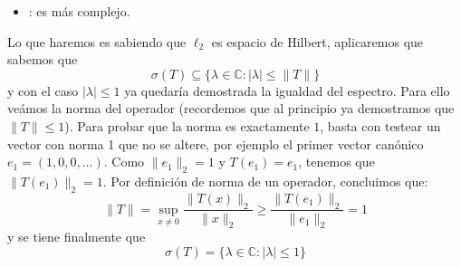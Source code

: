 \begin{ejercicio}
\begin{itemize}
        $$x_n = -\frac{1}{\lambda^{n-3}}$$
        Ahora veremos si $x$ pertenece a $\ell_2$ o no, para ello evaluamos su norma al cuadrado
        $$\|x\|_2^2 = \sum_{n=4}^{\infty} |x_n|^2 = \sum_{n=4}^{\infty} \frac{1}{|\lambda|^{2(n-3)}}= \sum_{m=1}^{\infty} \left(\frac{1}{|\lambda|^2}\right)^{m}$$
        Como $|\lambda| \leq 1$, entonces $\frac{1}{|\lambda|^2} \geq 1$, por lo que la serie no converge, lo que significa que $x \notin \ell_2$. Por tanto, el operador no es sobreyectivo, lo que implica que $\lambda$ pertenece al espectro $\sigma(T)$.
        \item {}: es más complejo.
    \end{itemize}
    Lo que haremos es sabiendo que $\ell_2$ es espacio de Hilbert, aplicaremos que sabemos que 
    \begin{equation*}
        \sigma(T)  \subseteq \{\lambda \in \mathbb{C} : |\lambda| \leq \|T\|\}
    \end{equation*}
    y con el caso $|\lambda| \leq 1$ ya quedaría demostrada la igualdad del espectro. Para ello veámos la norma del operador (recordemos que al principio ya demostramos que $\|T\|\leq 1$). Para probar que la norma es exactamente $1$, basta con testear un vector con norma 1 que no se altere, por ejemplo el primer vector canónico $e_1 = (1, 0, 0, \dots)$. Como $\|e_1\|_2 = 1$ y $T(e_1) = e_1$, tenemos que $\|T(e_1)\|_2 = 1$. Por definición de norma de un operador, concluimos que:
    $$\|T\| = \sup_{x \neq 0} \frac{\|T(x)\|_2}{\|x\|_2} \geq \frac{\|T(e_1)\|_2}{\|e_1\|_2} = 1$$
    y se tiene finalmente que
    \begin{equation*}
        \sigma(T) = \{\lambda \in \mathbb{C} : |\lambda| \leq 1\}
    \end{equation*}
\end{ejercicio}

